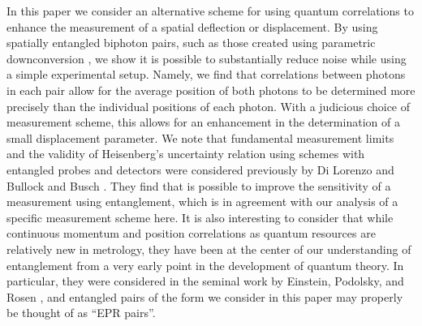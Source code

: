 In this paper we consider an alternative scheme for using quantum correlations to enhance the measurement of a spatial deflection or displacement.  
By using spatially entangled biphoton pairs, such as those created using parametric downconversion \cite{Schneeloch2015,Law2004,Fedorov2009}, we show it is possible to substantially reduce noise while using a simple experimental setup.
Namely, we find that correlations between photons in each pair allow for the average position of both photons to be determined more precisely than the individual positions of each photon.
With a judicious choice of measurement scheme, this allows for an enhancement in the determination of a small displacement parameter.
We note that fundamental measurement limits and the validity of Heisenberg's uncertainty relation using schemes with entangled probes and detectors were considered previously by Di Lorenzo \cite{DiLorenzo2013} and Bullock and Busch \cite{Bullock2014}.
They find that is possible to improve the sensitivity of a measurement using entanglement, which is in agreement with our analysis of a specific measurement scheme here.  
It is also interesting to consider that while continuous momentum and position correlations as quantum resources are relatively new in metrology, they have been at the center of our understanding of entanglement from a very early point in the development of quantum theory.
In particular, they were considered in the seminal work by Einstein, Podolsky, and Rosen \cite{Einstein1935}, and entangled pairs of the form we consider in this paper may properly be thought of as ``EPR pairs''.



